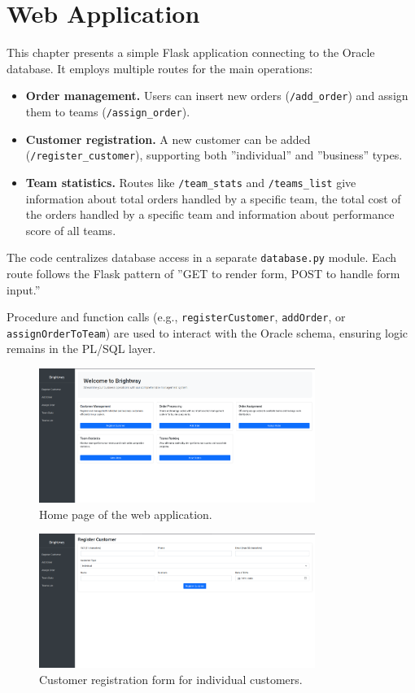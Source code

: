 \chapter{Web Application}

This chapter presents a simple Flask application connecting to the Oracle database. 
It employs multiple routes for the main operations:

\begin{itemize}
    \item \textbf{Order management.} Users can insert new orders (\texttt{/add\_order}) 
    and assign them to teams (\texttt{/assign\_order}).
    \item \textbf{Customer registration.} A new customer can be added (\texttt{/register\_customer}), 
    supporting both ''individual'' and ''business'' types.
    \item \textbf{Team statistics.} Routes like \texttt{/team\_stats} and \texttt{/teams\_list} 
    give information about total orders handled by a specific team, the total cost of the orders handled by a specific team and information about performance score of all teams.
\end{itemize}

The code centralizes database access in a separate \texttt{database.py} module. 
Each route follows the Flask pattern of ''GET to render form, POST to handle form input.'' 

Procedure and function calls (e.g., \texttt{registerCustomer}, \texttt{addOrder}, or \texttt{assignOrderToTeam}) are used to interact with the Oracle schema, ensuring logic remains in the PL/SQL layer.

\begin{figure}[H]
    \centering
    \includegraphics[width=0.8\textwidth]{img/web_app/home.png}
    \caption{Home page of the web application.}
\end{figure}

\begin{figure}[H]
    \centering
    \includegraphics[width=0.8\textwidth]{img/web_app/customer_i.png}
    \caption{Customer registration form for individual customers.}
\end{figure}

